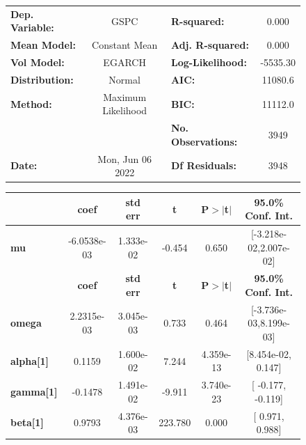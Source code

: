 \documentclass[a4paper, oneside]{discothesis}
\begin{document}
\begin{figure}
\begin{multicols}{2}
{  
\begin{center}
\begin{tabular}{lclc}
\toprule
\textbf{Dep. Variable:} &        GSPC        & \textbf{  R-squared:         } &     0.000   \\
\textbf{Mean Model:}    &   Constant Mean    & \textbf{  Adj. R-squared:    } &     0.000   \\
\textbf{Vol Model:}     &       EGARCH       & \textbf{  Log-Likelihood:    } &   -5535.30  \\
\textbf{Distribution:}  &       Normal       & \textbf{  AIC:               } &    11080.6  \\
\textbf{Method:}        & Maximum Likelihood & \textbf{  BIC:               } &    11112.0  \\
\textbf{}               &                    & \textbf{  No. Observations:  } &    3949     \\
\textbf{Date:}          &  Mon, Jun 06 2022  & \textbf{  Df Residuals:      } &    3948     \\
\bottomrule
\end{tabular}
\begin{tabular}{lccccc}
            & \textbf{coef} & \textbf{std err} & \textbf{t} & \textbf{P$> |$t$|$} & \textbf{95.0\% Conf. Int.}  \\
\midrule
\textbf{mu} &  -6.0538e-03  &    1.333e-02     &    -0.454  &          0.650       &   [-3.218e-02,2.007e-02]    \\
                  & \textbf{coef} & \textbf{std err} & \textbf{t} & \textbf{P$> |$t$|$} & \textbf{95.0\% Conf. Int.}  \\
\midrule
\textbf{omega}    &   2.2315e-03  &    3.045e-03     &     0.733  &          0.464       &   [-3.736e-03,8.199e-03]    \\
\textbf{alpha[1]} &       0.1159  &    1.600e-02     &     7.244  &      4.359e-13       &    [8.454e-02,  0.147]      \\
\textbf{gamma[1]} &      -0.1478  &    1.491e-02     &    -9.911  &      3.740e-23       &     [ -0.177, -0.119]       \\
\textbf{beta[1]}  &       0.9793  &    4.376e-03     &   223.780  &        0.000         &     [  0.971,  0.988]       \\
\bottomrule
\end{tabular}
\end{center}

}
\end{multicols}
\end{figure}
\end{document}
